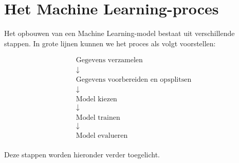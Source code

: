 \documentclass{ximera}
\begin{document}
\section*{Het Machine Learning-proces}
\label{Het Machine Learning-proces}

Het opbouwen van een Machine Learning-model bestaat uit verschillende stappen. In grote lijnen kunnen we het proces als volgt voorstellen:

\[
\boxed{
\begin{array}{c}
\text{Gegevens verzamelen}\\
\downarrow \\
\text{Gegevens voorbereiden en opsplitsen}\\
\downarrow \\
\text{Model kiezen}\\
\downarrow \\
\text{Model trainen}\\
\downarrow\\
\text{Model evalueren}\\
\end{array}
}
\]

Deze stappen worden hieronder verder toegelicht.
\end{document}
